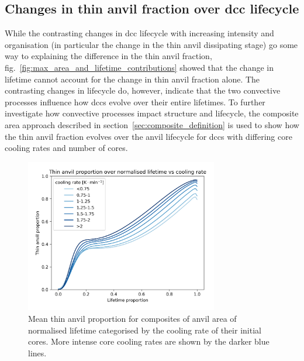 \subsection{Changes in thin anvil fraction over \acrshort{dcc} lifecycle} \label{sec:composite_results}

While the contrasting changes in \acrshort{dcc} lifecycle with increasing intensity and organisation (in particular the change in the thin anvil dissipating stage) go some way to explaining the difference in the thin anvil fraction, fig.~\ref{fig:max_area_and_lifetime_contributions} showed that the change in lifetime cannot account for the change in thin anvil fraction alone.
The contrasting changes in lifecycle do, however, indicate that the two convective processes influence how \acrshort{dcc}s evolve over their entire lifetimes.
To further investigate how convective processes impact structure and lifecycle, the composite area approach described in section~\ref{sec:composite_definition} is used to show how the thin anvil fraction evolves over the anvil lifecycle for \acrshort{dcc}s with differing core cooling rates and number of cores.


\begin{figure}[tp]
    \centering
    \includegraphics[width=0.75\textwidth]{figures/chapter3_13.png}
    \caption[
    Mean thin anvil proportion for composites of anvil area of normalised lifetime categorised by the cooling rate of their initial cores.
    ]{
    Mean thin anvil proportion for composites of anvil area of normalised lifetime categorised by the cooling rate of their initial cores. More intense core cooling rates are shown by the darker blue lines.
    }
    \label{fig:cooling_rate_composite}
\end{figure}


